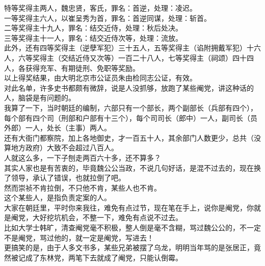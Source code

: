 \begin{multicols}{\theparacolNo}
特等奖得主两人，魏忠贤，客氏，罪名：首逆，处理：凌迟。\\

一等奖得主六人，以崔呈秀为首，罪名：首逆同谋，处理：斩首。\\

二等奖得主十九人，罪名：结交近侍，处理：秋后处决。\\

三等奖得主十一人，罪名：结交近侍次等，处理：流放。\\

此外，还有四等奖得主（逆孽军犯）三十五人，五等奖得主（谄附拥戴军犯）十六人，六等奖得主（交结近侍又次等）一百二十八人，七等奖得主（祠颂）四十四人，各获得充军、有期徒刑、免职等奖励。\\

以上得奖结果，由大明北京市公证员朱由检同志公证，有效。\\

对此名单，许多史书都颇有微辞，说是人没抓够，放跑了某些阉党，讲这种话的人，脑袋是有问题的。\\

我算了一下，当时朝廷的编制，六部只有一个部长，两个副部长（兵部有四个），每个部有四个司（刑部和户部有十三个），每个司司长（郎中）一人，副司长（员外郎）一人，处长（主事）两人。\\

还有大衙门都察院，加上各地御史，才一百五十人，其余部门人数更少，总共（没算地方政府）大致不会超过八百人。\\

人就这么多，一下子刨走两百六十多，还不算多？\\

其实人家也是有苦衷的，毕竟魏公公当政，不说几句好话，是混不过去的，现在换了领导，承认了错误，也就拉倒了吧。\\

然而崇祯不肯拉倒，不只他不肯，某些人也不肯。\\

这个某些人，是指负责定案的人。\\

大家在朝廷里，平时你来我往，难免有点过节，现在笔在手上，说你是阉党，你就是阉党，大好挖坑机会，不整一下，难免有点说不过去。\\

比如大学士韩旷，清查阉党毫不积极，整人倒是毫不含糊，骂过魏公公的，不一定不是阉党，骂过他的，就一定是阉党，写进去！\\

更搞笑的是，由于人多文书多，某些兄弟被摆了乌龙，明明当年骂的是张居正，竟然被记成了东林党，两笔下去就成了阉党，只能认倒霉。\\


\end{multicols}
